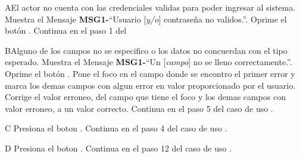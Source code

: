 		\begin{UCtrayectoriaA}{A}{El actor no cuenta con las credenciales validas para poder ingresar al sistema.}
			\UCpaso Muestra el Mensaje {\bf MSG1-}``Usuario [{\em y/o}] contraseña no validos.''.
			\UCpaso[\UCactor] Oprime el botón .
			\UCpaso Continua en el paso 1 del 
		\end{UCtrayectoriaA}
		
		\begin{UCtrayectoriaA}{B}{Alguno de los campos no se especifico o los datos no concuerdan con el tipo esperado.}
			\UCpaso Muestra el Mensaje {\bf MSG1-}``Un [{\em campo}] no se lleno correctamente.''.
			\UCpaso[\UCactor] Oprime el botón .
			\UCpaso Pone el foco en el campo donde se encontro el primer error y marca los demas campos con algun error en valor proporcionado por el usuario.
			\UCpaso[\UCactor] Corrige el valor erroneo, del campo que tiene el foco y los demas campos con valor erroneo, a un valor correcto.
			\UCpaso Continua en el paso 5 del caso de uso .
		\end{UCtrayectoriaA}
 
		\begin{UCtrayectoriaA}{C}{}
			\UCpaso[\UCactor] Presiona el boton .
			\UCpaso Continua en el paso 4 del caso de uso .
		\end{UCtrayectoriaA}
		
		\begin{UCtrayectoriaA}{D}{}
			\UCpaso[\UCactor] Presiona el boton .
			\UCpaso Continua en el paso 12 del caso de uso .
		\end{UCtrayectoriaA}

